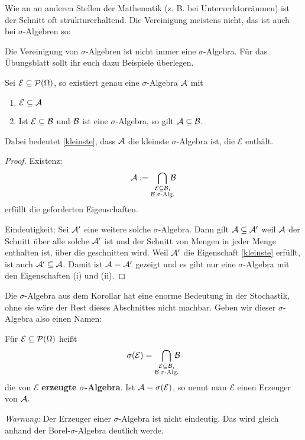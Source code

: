 Wie an an anderen Stellen der Mathematik (z. B. bei Unterverktorr\"aumen) ist der Schnitt oft strukturerhaltend. Die Vereinigung meistens nicht, das ist auch bei $\sigma$-Algebren so:
\begin{bem} 
	Die Vereinigung von $\sigma$-Algebren ist nicht immer eine $\sigma$-Algebra. F\"ur das \"Ubungsblatt sollt ihr euch dazu Beispiele \"uberlegen.
\end{bem}

\begin{korollar}
	Sei $\mathcal E \subseteq \mathcal{P} (\Omega)$, so existiert genau eine $\sigma$-Algebra $\mathcal{A}$ mit
	\begin{enumerate}[label=(\roman*)]
		\item $\mathcal E \subseteq \mathcal{A}$
		\item \label{kleinste} Ist $\mathcal E \subseteq \mathcal{B}$ und $\mathcal{B}$ ist eine $\sigma$-Algebra, so gilt $\mathcal{A} \subseteq \mathcal{B}$.
	\end{enumerate}
	Dabei bedeutet \ref{kleinste}, dass $\mathcal{A}$ die kleinste $\sigma$-Algebra ist, die $\mathcal E$ enthält.
\end{korollar}

\begin{proof}
		Existenz: \[ \mathcal{A} := \bigcap\limits_{\substack{\mathcal E \subseteq \mathcal{B}, \\ \mathcal{B} \: \sigma \text{-Alg.}}} \! \! \! \! \mathcal{B}  \]
		erf\"ullt die geforderten Eigenschaften.\smallskip
		
		Eindeutigkeit: Sei $\mathcal{A}'$ eine weitere solche $\sigma$-Algebra. Dann gilt $\mathcal{A} \subseteq \mathcal{A}'$ weil $\mathcal{A} $ der Schnitt über alle solche $\mathcal{A}'$ ist und der Schnitt von Mengen in jeder Menge enthalten ist, \"uber die geschnitten wird. Weil $\mathcal{A}'$ die Eigenschaft \ref{kleinste} erf\"ullt, ist auch $\mathcal{A}' \subseteq \mathcal{A}$. Damit ist $\mathcal{A} = \mathcal{A}'$ gezeigt und es gibt nur eine $\sigma$-Algebra mit den Eigenschaften (i) und (ii).
\end{proof}
Die $\sigma$-Algebra aus dem Korollar hat eine enorme Bedeutung in der Stochastik, ohne sie w\"are der Rest dieses Abschnittes nicht machbar. Geben wir dieser $\sigma$-Algebra also einen Namen:
\begin{deff} 
	Für $\mathcal E \subseteq \mathcal{P}(\Omega)$ heißt  \[\sigma (\mathcal E) = \bigcap\limits_{\substack{\mathcal E \subseteq \mathcal{B}, \\ \mathcal{B} \: \sigma \text{-Alg.}}} \! \! \! \! \mathcal{B} \] die von $\mathcal E$ \textbf{erzeugte $\sigma$-Algebra}. Ist $\mathcal{A} = \sigma(\mathcal E)$, so nennt man $\mathcal E$ einen Erzeuger von $\mathcal{A}.$
\end{deff}
\textit{Warnung:} Der Erzeuger einer $\sigma$-Algebra ist nicht eindeutig. Das wird gleich anhand der Borel-$\sigma$-Algebra deutlich werde.\smallskip

